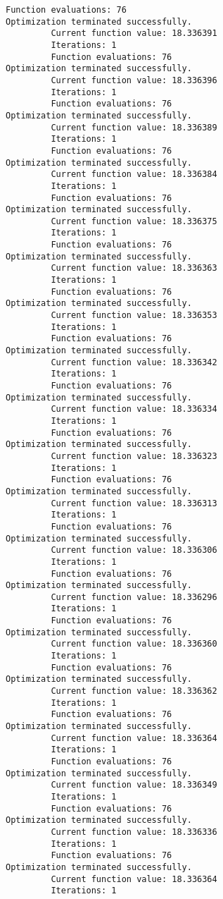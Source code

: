\documentclass[11pt]{article}
\begin{document}
\begin{Verbatim}[commandchars=\\\{\}]
         Function evaluations: 76
Optimization terminated successfully.
         Current function value: 18.336391
         Iterations: 1
         Function evaluations: 76
Optimization terminated successfully.
         Current function value: 18.336396
         Iterations: 1
         Function evaluations: 76
Optimization terminated successfully.
         Current function value: 18.336389
         Iterations: 1
         Function evaluations: 76
Optimization terminated successfully.
         Current function value: 18.336384
         Iterations: 1
         Function evaluations: 76
Optimization terminated successfully.
         Current function value: 18.336375
         Iterations: 1
         Function evaluations: 76
Optimization terminated successfully.
         Current function value: 18.336363
         Iterations: 1
         Function evaluations: 76
Optimization terminated successfully.
         Current function value: 18.336353
         Iterations: 1
         Function evaluations: 76
Optimization terminated successfully.
         Current function value: 18.336342
         Iterations: 1
         Function evaluations: 76
Optimization terminated successfully.
         Current function value: 18.336334
         Iterations: 1
         Function evaluations: 76
Optimization terminated successfully.
         Current function value: 18.336323
         Iterations: 1
         Function evaluations: 76
Optimization terminated successfully.
         Current function value: 18.336313
         Iterations: 1
         Function evaluations: 76
Optimization terminated successfully.
         Current function value: 18.336306
         Iterations: 1
         Function evaluations: 76
Optimization terminated successfully.
         Current function value: 18.336296
         Iterations: 1
         Function evaluations: 76
Optimization terminated successfully.
         Current function value: 18.336360
         Iterations: 1
         Function evaluations: 76
Optimization terminated successfully.
         Current function value: 18.336362
         Iterations: 1
         Function evaluations: 76
Optimization terminated successfully.
         Current function value: 18.336364
         Iterations: 1
         Function evaluations: 76
Optimization terminated successfully.
         Current function value: 18.336349
         Iterations: 1
         Function evaluations: 76
Optimization terminated successfully.
         Current function value: 18.336336
         Iterations: 1
         Function evaluations: 76
Optimization terminated successfully.
         Current function value: 18.336364
         Iterations: 1

\end{Verbatim}
\end{document}
